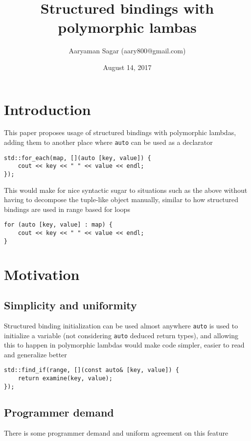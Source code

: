 \documentclass{article}
\begin{document}
\title{\textbf{Structured bindings with polymorphic lambas}}
\author{Aaryaman Sagar (aary800@gmail.com)}
\date{August 14, 2017}
\maketitle

\section{Introduction}

This paper proposes usage of structured bindings with polymorphic lambdas,
adding them to another place where \texttt{auto} can be used as a declarator

\begin{lstlisting}
std::for_each(map, [](auto [key, value]) {
    cout << key << " " << value << endl;
});
\end{lstlisting}

This would make for nice syntactic sugar to situations such as the above
without having to decompose the tuple-like object manually, similar to how
structured bindings are used in range based for loops

\begin{lstlisting}
for (auto [key, value] : map) {
    cout << key << " " << value << endl;
}
\end{lstlisting}


\section{Motivation}

\subsection{Simplicity and uniformity}
Structured binding initialization can be used almost anywhere \texttt{auto} is
used to initialize a variable (not considering \texttt{auto} deduced return
types), and allowing this to happen in polymorphic lambdas would make code
simpler, easier to read and generalize better

\begin{lstlisting}
std::find_if(range, [](const auto& [key, value]) {
    return examine(key, value);
});
\end{lstlisting}

\subsection{Programmer demand}
There is some programmer demand and uniform agreement on this feature
\end{document}
